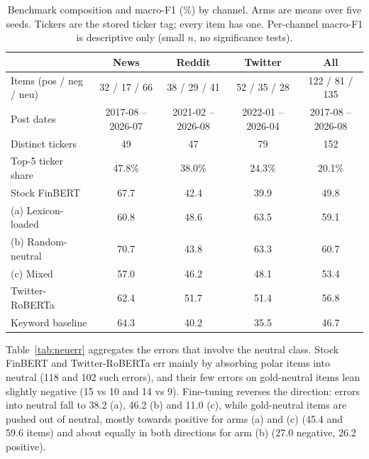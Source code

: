 \documentclass{aims}
\numberwithin{equation}{section}
\begin{document}
\begin{table}[ht]
\centering
\caption{Benchmark composition and macro-F1 (\%) by channel. Arms are means over five
seeds. Tickers are the stored ticker tag; every item has one. Per-channel macro-F1 is
descriptive only (small $n$, no significance tests).}
\label{tab:source}
\small
\begin{tabular}{lcccc}
\toprule
 & \textbf{News} & \textbf{Reddit} & \textbf{Twitter} & \textbf{All} \\
\midrule
Items (pos / neg / neu) & 32 / 17 / 66 & 38 / 29 / 41 & 52 / 35 / 28 & 122 / 81 / 135 \\
Post dates & 2017-08 -- 2026-07 & 2021-02 -- 2026-08 & 2022-01 -- 2026-04 & 2017-08 -- 2026-08 \\
Distinct tickers & 49 & 47 & 79 & 152 \\
Top-5 ticker share & 47.8\% & 38.0\% & 24.3\% & 20.1\% \\
\midrule
Stock FinBERT & 67.7 & 42.4 & 39.9 & 49.8 \\
(a) Lexicon-loaded & 60.8 & 48.6 & 63.5 & 59.1 \\
(b) Random-neutral & 70.7 & 43.8 & 63.3 & 60.7 \\
(c) Mixed & 57.0 & 46.2 & 48.1 & 53.4 \\
Twitter-RoBERTa & 62.4 & 51.7 & 51.4 & 56.8 \\
Keyword baseline & 64.3 & 40.2 & 35.5 & 46.7 \\
\bottomrule
\end{tabular}
\end{table}

Table~\ref{tab:neuerr} aggregates the errors that involve the neutral class.
Stock FinBERT and Twitter-RoBERTa err mainly by absorbing polar items into neutral
(118 and 102 such errors), and their few errors on gold-neutral items lean slightly
negative (15 vs 10 and 14 vs 9). Fine-tuning reverses the direction: errors into
neutral fall to 38.2 (a), 46.2 (b) and 11.0 (c), while gold-neutral items are pushed
out of neutral, mostly towards positive for arms (a) and (c) (45.4 and 59.6 items)
and about equally in both directions for arm (b) (27.0 negative, 26.2 positive).
\end{document}
